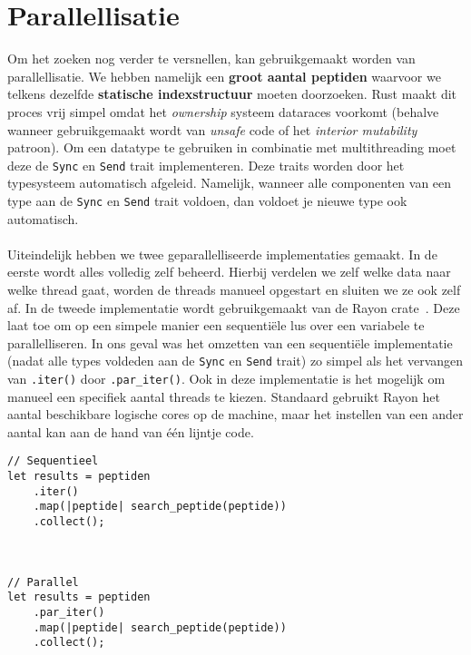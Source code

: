 \section{Parallellisatie}\label{sec:parallellisatie}
Om het zoeken nog verder te versnellen, kan gebruikgemaakt worden van parallellisatie.
We hebben namelijk een \textbf{groot aantal peptiden} waarvoor we telkens dezelfde \textbf{statische indexstructuur} moeten doorzoeken.
Rust maakt dit proces vrij simpel omdat het \textit{ownership} systeem dataraces voorkomt (behalve wanneer gebruikgemaakt wordt van \textit{unsafe} code of het \textit{interior mutability} patroon)\cite{rust_data_races}.
Om een datatype te gebruiken in combinatie met multithreading moet deze de \texttt{Sync} en \texttt{Send} trait implementeren.
Deze traits worden door het typesysteem automatisch afgeleid.
Namelijk, wanneer alle componenten van een type aan de \texttt{Sync} en \texttt{Send} trait voldoen, dan voldoet je nieuwe type ook automatisch.
\\ \\
Uiteindelijk hebben we twee geparallelliseerde implementaties gemaakt.
In de eerste wordt alles volledig zelf beheerd.
Hierbij verdelen we zelf welke data naar welke thread gaat, worden de threads manueel opgestart en sluiten we ze ook zelf af.
In de tweede implementatie wordt gebruikgemaakt van de Rayon crate~\cite{rayon}.
Deze laat toe om op een simpele manier een sequentiële lus over een variabele te parallelliseren.
In ons geval was het omzetten van een sequentiële implementatie (nadat alle types voldeden aan de \texttt{Sync} en \texttt{Send} trait) zo simpel als het vervangen van \texttt{.iter()} door \texttt{.par\_iter()}.
Ook in deze implementatie is het mogelijk om manueel een specifiek aantal threads te kiezen.
Standaard gebruikt Rayon het aantal beschikbare logische cores op de machine, maar het instellen van een ander aantal kan aan de hand van één lijntje code.

\begin{verbatim}
// Sequentieel
let results = peptiden
    .iter()
    .map(|peptide| search_peptide(peptide))
    .collect();



// Parallel
let results = peptiden
    .par_iter()
    .map(|peptide| search_peptide(peptide))
    .collect();
\end{verbatim}

